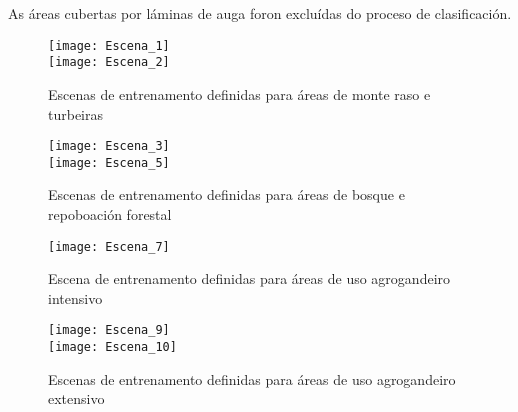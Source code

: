 \documentclass[11pt,a4paper]{article}
\begin{document}
As áreas cubertas por láminas de auga foron excluídas do proceso de clasificación.


\begin{figure}
\caption{Escenas de entrenamento definidas para áreas de monte raso e turbeiras}\label{fig:escenas1}
\texttt{[image: Escena\_1]}\\
\texttt{[image: Escena\_2]}
\end{figure}

\begin{figure}
\caption{Escenas de entrenamento definidas para áreas de bosque e repoboación forestal}\label{fig:escenas2}
\texttt{[image: Escena\_3]}\\
\texttt{[image: Escena\_5]}
\end{figure}

\begin{figure}
\caption{Escena de entrenamento definidas para áreas de uso agrogandeiro intensivo}\label{fig:escenas3}
\texttt{[image: Escena\_7]}
\end{figure}

\begin{figure}
\caption{Escenas de entrenamento definidas para áreas de uso agrogandeiro extensivo}\label{fig:escenas4}
\texttt{[image: Escena\_9]}\\
\texttt{[image: Escena\_10]}
\end{figure}
\end{document}
